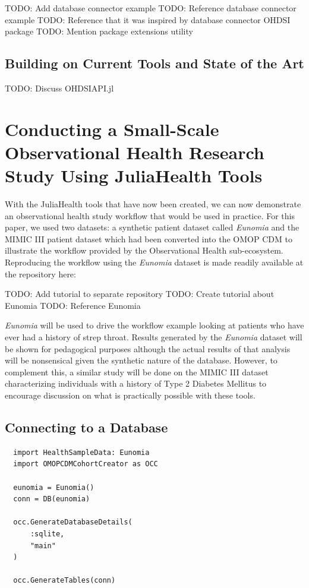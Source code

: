 \documentclass{juliacon}
\begin{document}
TODO: Add database connector example
TODO: Reference database connector example
TODO: Reference that it was inspired by database connector OHDSI package
TODO: Mention package extensions utility

\subsection{Building on Current Tools and State of the Art}

TODO: Discuss OHDSIAPI.jl

\section{Conducting a Small-Scale Observational Health Research Study Using JuliaHealth Tools}

With the JuliaHealth tools that have now been created, we can now demonstrate an observational health study workflow that would be used in practice.
For this paper, we used two datasets: a synthetic patient dataset called \textit{Eunomia} and the MIMIC III patient dataset which had been converted into the OMOP CDM to illustrate the workflow provided by the Observational Health sub-ecosystem.
Reproducing the workflow using the \textit{Eunomia} dataset is made readily available at the repository here:

TODO: Add tutorial to separate repository
TODO: Create tutorial about Eunomia
TODO: Reference Eunomia

\textit{Eunomia} will be used to drive the workflow example looking at patients who have ever had a history of strep throat.
Results generated by the \textit{Eunomia} dataset will be shown for pedagogical purposes although the actual results of that analysis will be nonsensical given the synthetic nature of the database.
However, to complement this, a similar study will be done on the MIMIC III dataset characterizing individuals with a history of Type 2 Diabetes Mellitus to encourage discussion on what is practically possible with these tools.

\subsection{Connecting to a Database}

\begin{verbatim}
  import HealthSampleData: Eunomia
  import OMOPCDMCohortCreator as OCC

  eunomia = Eunomia()
  conn = DB(eunomia)

  occ.GenerateDatabaseDetails(
      :sqlite,
      "main"
  )

  occ.GenerateTables(conn)
\end{verbatim}
\end{document}
